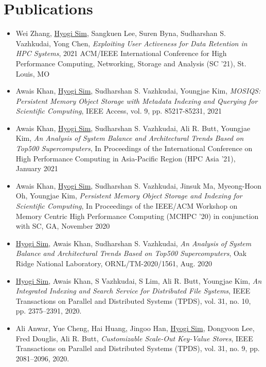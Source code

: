 \section{Publications}
\begin{itemize}
    \item Wei Zhang, \underline{Hyogi Sim}, Sangkuen Lee, Suren Byna, Sudharshan S. Vazhkudai, Yong Chen,
        {\it Exploiting User Activeness for Data Retention in HPC Systems},
        2021 ACM/IEEE International Conference for High
        Performance Computing, Networking, Storage and Analysis (SC '21), St. Louis, MO
    \item Awais Khan, \underline{Hyogi Sim}, Sudharshan S. Vazhkudai, Youngjae Kim,
        {\it MOSIQS: Persistent Memory Object Storage with Metadata Indexing and Querying for Scientific Computing},
        IEEE Access, vol. 9, pp. 85217-85231, 2021
    \item Awais Khan, \underline{Hyogi Sim}, Sudharshan S. Vazhkudai, Ali R. Butt, Youngjae Kim,
        {\it An Analysis of System Balance and Architectural Trends Based on Top500 Supercomputers},
        In Proceedings of the International Conference on High Performance Computing in Asia-Pacific Region
        (HPC Asia '21), January 2021
    \item Awais Khan, \underline{Hyogi Sim}, Sudharshan S. Vazhkudai, Jinsuk Ma, Myeong-Hoon Oh, Youngjae Kim,
        {\it Persistent Memory Object Storage and Indexing for Scientific Computing},
        In Proceedings of the IEEE/ACM Workshop on Memory Centric High Performance Computing (MCHPC '20)
        in conjunction with SC, GA, November 2020
    \item \underline{Hyogi Sim}, Awais Khan, Sudharshan S. Vazhkudai,
        {\it An Analysis of System Balance and Architectural Trends Based on Top500 Supercomputers},
        Oak Ridge National Laboratory, ORNL/TM-2020/1561, Aug. 2020
    \item \underline{Hyogi Sim}, Awais Khan, S Vazhkudai, S Lim, Ali R. Butt, Youngjae Kim,
        {\it An Integrated Indexing and Search Service for Distributed File Systems},
        IEEE Transactions on Parallel and Distributed Systems (TPDS),
        vol. 31, no. 10, pp. 2375–2391, 2020.
    \item Ali Anwar, Yue Cheng, Hai Huang, Jingoo Han, \underline{Hyogi Sim},
        Dongyoon Lee, Fred Douglis, Ali R. Butt,
        {\it Customizable Scale-Out Key-Value Stores},
        IEEE Transactions on Parallel and Distributed Systems (TPDS),
        vol. 31, no. 9, pp. 2081–2096, 2020.

\end{itemize}
